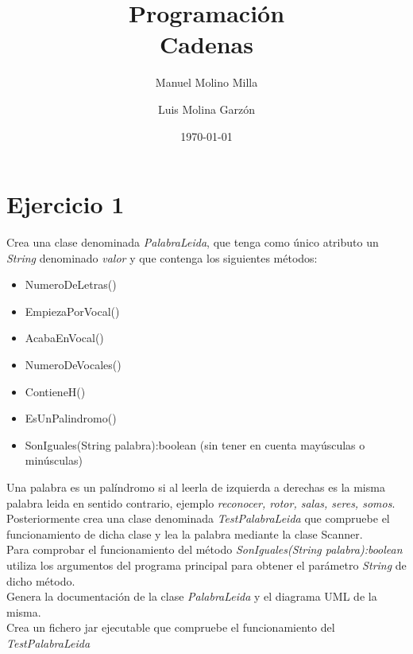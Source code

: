 \documentclass[4paper]{article}
\author{Manuel Molino Milla \and Luis Molina Garzón}
\title{\textbf{Programación}
\\Cadenas}
\date{\today}
\begin{document}
\maketitle


\section*{Ejercicio 1}
Crea una clase denominada \emph{PalabraLeida}, que tenga como único atributo un \emph{String} denominado \emph{valor} y que contenga los siguientes métodos:
\begin{itemize}
\item NumeroDeLetras()
\item EmpiezaPorVocal()
\item AcabaEnVocal()
\item NumeroDeVocales()
\item ContieneH()
\item EsUnPalindromo()
\item SonIguales(String palabra):boolean (sin tener en cuenta mayúsculas o minúsculas)
\end{itemize}
Una palabra es un palíndromo si al leerla de izquierda a derechas es la misma palabra leida en sentido contrario, ejemplo \emph{reconocer, rotor, salas, seres, somos}.\\
Posteriormente crea una clase denominada \emph{TestPalabraLeida} que compruebe el funcionamiento de dicha clase y lea la palabra mediante la clase Scanner.\\ Para comprobar el funcionamiento del método \emph{SonIguales(String palabra):boolean} utiliza los argumentos del programa principal para obtener el parámetro \emph{String} de dicho método.\\
Genera la documentación de la clase \emph{PalabraLeida} y el diagrama UML de la misma.\\
Crea un fichero jar ejecutable que compruebe el funcionamiento del \emph{TestPalabraLeida}
\end{document}

